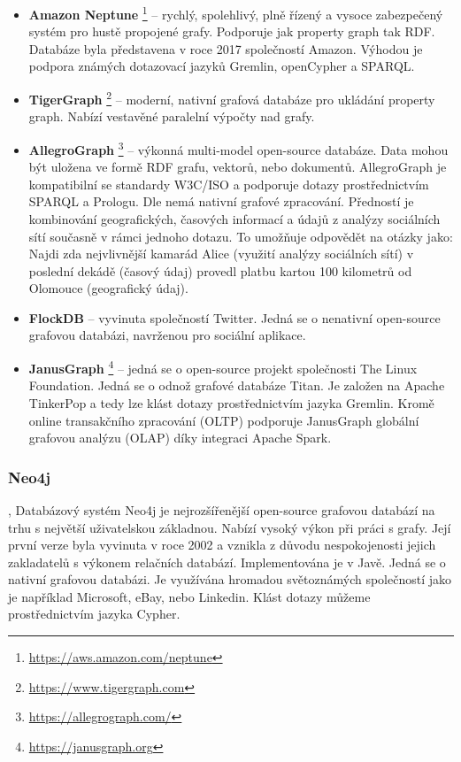 \documentclass[
  program=infoi,
  biblatex=true,
  sourcecodes=true,
  figures=true,
  glossaries=false,
  index
]{kidiplom}
\begin{document}
\begin{itemize}
\item \textbf{Amazon Neptune} \footnote{\url{https://aws.amazon.com/neptune}} -- rychlý, spolehlivý, plně řízený a vysoce zabezpečený systém pro hustě propojené grafy. Podporuje jak property graph tak RDF. Databáze byla představena v roce 2017 společností Amazon. Výhodou je podpora známých dotazovací jazyků Gremlin, openCypher a SPARQL.
\item \textbf{TigerGraph} \footnote{\url{https://www.tigergraph.com}} -- moderní, nativní grafová databáze pro ukládání property graph. Nabízí vestavěné paralelní výpočty nad grafy.
\item \textbf{AllegroGraph} \footnote{\url{https://allegrograph.com/}} -- výkonná multi-model open-source databáze. Data mohou být uložena ve formě RDF grafu, vektorů, nebo dokumentů. AllegroGraph je kompatibilní se standardy W3C/ISO a podporuje dotazy prostřednictvím SPARQL a Prologu. Dle \cite{graphDatabases} nemá nativní grafové zpracování. Předností je kombinování geografických, časových informací a údajů z analýzy sociálních sítí současně v rámci jednoho dotazu. To umožňuje odpovědět na otázky jako: Najdi zda nejvlivnější kamarád Alice (využití analýzy sociálních sítí) v poslední dekádě (časový údaj) provedl platbu kartou 100 kilometrů od Olomouce (geografický údaj). 
\item \textbf{FlockDB} -- vyvinuta společností Twitter. Jedná se o nenativní open-source grafovou databázi, navrženou pro sociální aplikace.
\item \textbf{JanusGraph} \footnote{\url{https://janusgraph.org}} -- jedná se o open-source projekt společnosti The Linux Foundation. Jedná se o odnož grafové databáze Titan. Je založen na Apache TinkerPop a tedy lze klást dotazy prostřednictvím jazyka Gremlin. Kromě online transakčního zpracování (OLTP) podporuje JanusGraph globální grafovou analýzu (OLAP) díky integraci Apache Spark.
\end{itemize}

\subsubsection{Neo4j}
\cite{neo4jDoc}, \cite{neo4jDev}
Databázový systém Neo4j je nejrozšířenější open-source grafovou databází na trhu s největší uživatelskou základnou. Nabízí vysoký výkon při práci s grafy. Její první verze byla vyvinuta v roce 2002 a vznikla z důvodu nespokojenosti jejich zakladatelů s výkonem relačních databází. Implementována je v Javě. Jedná se o nativní grafovou databázi. Je využívána hromadou světoznámých společností jako je například Microsoft, eBay, nebo Linkedin. Klást dotazy můžeme prostřednictvím jazyka Cypher.
\end{document}
